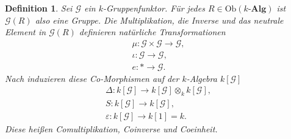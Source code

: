 \documentclass[a4paper, 11pt]{scrartcl}
\newcommand{\Ob}{\text{Ob}}
\theoremstyle{basicstyle}
\newtheorem{definition}{Definition}[section]
\begin{document}
    \begin{definition}
        Sei \(\mathcal{G}\) ein \(k\)-Gruppenfunktor.
        Für jedes \(R \in \Ob(k\textbf{-Alg})\) ist \(\mathcal{G}(R)\) also eine Gruppe.
        Die Multiplikation, die Inverse und das neutrale Element in \(\mathcal{G}(R)\) definieren natürliche Transformationen
        \begin{gather*}
            \mu : \mathcal{G} \times \mathcal{G} \longrightarrow \mathcal{G}, \\
            \iota : \mathcal{G} \longrightarrow \mathcal{G}, \\
            e : \ast \longrightarrow \mathcal{G}.
        \end{gather*}
        Nach  induzieren diese Co-Morphismen auf der \(k\)-Algebra \(k[\mathcal{G}]\)
        \begin{gather*}
            \Delta : k[\mathcal{G}] \longrightarrow k[\mathcal{G}] \otimes_k k[\mathcal{G}], \\
            S: k[\mathcal{G}] \longrightarrow k[\mathcal{G}], \\
            \varepsilon : k[\mathcal{G}] \longrightarrow k[1] = k.
        \end{gather*}
        Diese heißen \emph{Comultiplikation}, \emph{Coinverse} und \emph{Coeinheit}.
    \end{definition}
\end{document}
